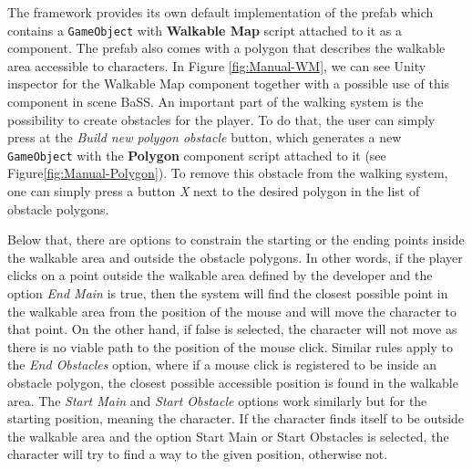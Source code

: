 The framework provides its own default implementation of the prefab which contains a \verb|GameObject| with \textbf{Walkable Map} script attached to it as a component. The prefab also comes with a polygon that describes the walkable area accessible to characters. In Figure \ref{fig:Manual-WM}, we can see Unity inspector for the Walkable Map component together with a possible use of this component in scene BaSS. An important part of the walking system is the possibility to create obstacles for the player. To do that, the user can simply press at the \textit{Build new polygon obstacle} button, which generates a new \verb|GameObject| with the \textbf{Polygon} component script attached to it (see Figure\ref{fig:Manual-Polygon}). To remove this obstacle from the walking system, one can simply press a button \textit{X} next to the desired polygon in the list of obstacle polygons. 

Below that, there are options to constrain the starting or the ending points inside the walkable area and outside the obstacle polygons. In other words, if the player clicks on a point outside the walkable area defined by the developer and the option \textit{End Main} is true, then the system will find the closest possible point in the walkable area from the position of the mouse and will move the character to that point. On the other hand, if false is selected, the character will not move as there is no viable path to the position of the mouse click. Similar rules apply to the \textit{End Obstacles} option, where if a mouse click is registered to be inside an obstacle polygon, the closest possible accessible position is found in the walkable area. The \textit{Start Main} and \textit{Start Obstacle} options work similarly but for the starting position, meaning the character. If the character finds itself to be outside the walkable area and the option Start Main or Start Obstacles is selected, the character will try to find a way to the given position, otherwise not.

